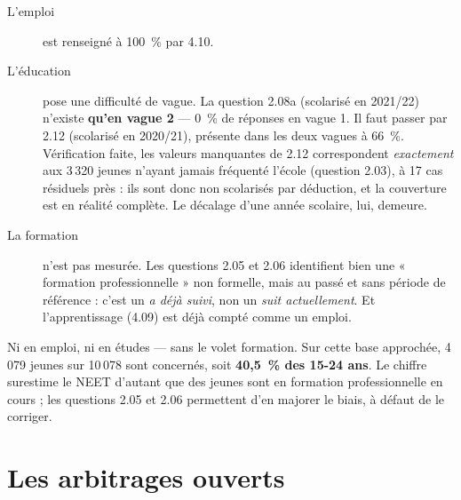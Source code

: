 \documentclass[11pt,a4paper]{article}
\begin{document}
\begin{description}
  \item[L'emploi] est renseigné à 100~\% par 4.10.
  \item[L'éducation] pose une difficulté de vague. La question 2.08a (scolarisé en 2021/22)
  n'existe \textbf{qu'en vague 2} --- 0~\% de réponses en vague 1. Il faut passer par 2.12
  (scolarisé en 2020/21), présente dans les deux vagues à 66~\%. Vérification faite, les valeurs
  manquantes de 2.12 correspondent \emph{exactement} aux 3\,320 jeunes n'ayant jamais fréquenté
  l'école (question 2.03), à 17 cas résiduels près : ils sont donc non scolarisés par déduction,
  et la couverture est en réalité complète. Le décalage d'une année scolaire, lui, demeure.
  \item[La formation] n'est pas mesurée. Les questions 2.05 et 2.06 identifient bien une
  « formation professionnelle » non formelle, mais au passé et sans période de référence : c'est
  un \emph{a déjà suivi}, non un \emph{suit actuellement}. Et l'apprentissage (4.09) est déjà
  compté comme un emploi.
\end{description}

\begin{attention}
Ni en emploi, ni en études --- sans le volet formation. Sur cette base approchée, 4\,079 jeunes
sur 10\,078 sont concernés, soit \textbf{40,5~\% des 15-24 ans}. Le chiffre surestime le NEET
d'autant que des jeunes sont en formation professionnelle en cours ; les questions 2.05 et 2.06
permettent d'en majorer le biais, à défaut de le corriger.
\end{attention}

\section{Les arbitrages ouverts}
\end{document}
